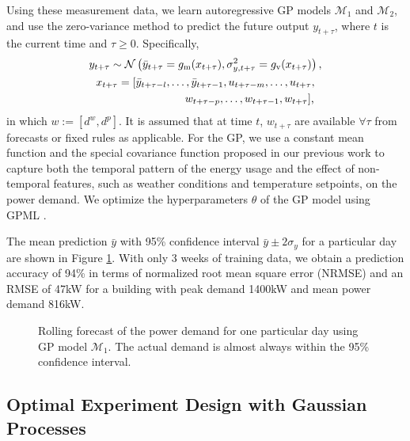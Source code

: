 Using these measurement data, we learn autoregressive GP models \(\mathcal{M}_1\) and \(\mathcal{M}_2\), and use the zero-variance method to predict the future output \(y_{t+\tau}\), where $t$ is the current time and \( \tau \ge 0\).
Specifically,
\begin{gather}
\label{eq:dpc:prediction}
y_{t+\tau} \sim \operatorname*{\mathcal{N}}\left(\bar{y}_{t+\tau} = g_{\mathrm m}(x_{t+\tau}), \sigma^2_{y, t+\tau} = g_{\mathrm v}(x_{t+\tau})\right), \\
x_{t + \tau} = [\bar y_{t+ \tau-l}, \dots, \bar y_{t+ \tau-1}, u_{t+ \tau-m}, \dots, u_{t+ \tau}, \nonumber \\
\qquad\qquad\qquad\qquad  w_{t+ \tau-p}, \dots, w_{t+ \tau-1}, w_{t+ \tau}]\text, \nonumber
\end{gather}
in which \(w:=[d^w, d^p]\).
It is assumed that at time \(t\), \(w_{t+\tau}\) are available \(\forall \tau \) from forecasts or fixed rules as applicable.
For the GP, we use a constant mean function and the special covariance function proposed in our previous work \cite{nghiemetal16gp} to capture both the temporal pattern of the energy usage and the effect of non-temporal features, such as weather conditions and temperature setpoints, on the power demand.
We optimize the hyperparameters \(\theta\) %
of the GP model using GPML \cite{Rasmussen2010}.

The mean prediction \(\bar{y}\) with 95\% confidence interval \(\bar{y} \pm 2\sigma_y\) for a particular day are shown in Figure \ref{F:prediction}. With only 3 weeks of training data, we obtain a prediction accuracy of 94\% in terms of normalized root mean square error (NRMSE) and an RMSE of 47kW for a building with peak demand 1400kW and mean power demand 816kW.

\begin{figure}[t]
	\centering
	\setlength{} 
	\setlength{}
	
	\caption{Rolling forecast of the power demand for one particular day using GP model \(\mathcal{M}_1\). The actual demand is almost always within the 95\% confidence interval.}
	\label{F:prediction}
\end{figure}


\subsection{Optimal Experiment Design with Gaussian Processes}
\label{sec:modeling:oed}

